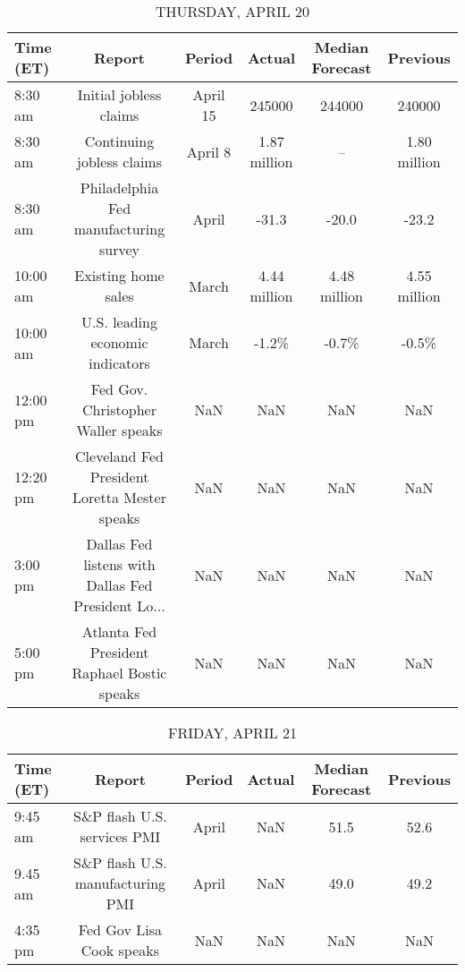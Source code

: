 \documentclass{article}%
\begin{document}
%


\begin{table}[htbp]%
\caption{THURSDAY, APRIL 20}%
\centering%
\begin{adjustbox}{width=1\textwidth}%
\begin{tabular}{lccccc}
\toprule
Time (ET) &                                             Report &   Period &       Actual & Median Forecast &     Previous \\
\midrule
  8:30 am &                             Initial jobless claims & April 15 &       245000 &          244000 &       240000 \\
  8:30 am &                          Continuing jobless claims &  April 8 & 1.87 million &              -- & 1.80 million \\
  8:30 am &              Philadelphia Fed manufacturing survey &    April &        -31.3 &           -20.0 &        -23.2 \\
 10:00 am &                                Existing home sales &    March & 4.44 million &    4.48 million & 4.55 million \\
 10:00 am &                   U.S. leading economic indicators &    March &        -1.2\% &           -0.7\% &        -0.5\% \\
 12:00 pm &                 Fed Gov. Christopher Waller speaks &      NaN &          NaN &             NaN &          NaN \\
 12:20 pm &      Cleveland Fed President Loretta Mester speaks &      NaN &          NaN &             NaN &          NaN \\
  3:00 pm & Dallas Fed listens with Dallas Fed President Lo... &      NaN &          NaN &             NaN &          NaN \\
  5:00 pm &        Atlanta Fed President Raphael Bostic speaks &      NaN &          NaN &             NaN &          NaN \\
\bottomrule
\end{tabular}
%
\end{adjustbox}%
\end{table}

%


\begin{table}[htbp]%
\caption{FRIDAY, APRIL 21}%
\centering%
\begin{adjustbox}{width=1\textwidth}%
\begin{tabular}{lccccc}
\toprule
Time (ET) &                           Report & Period & Actual & Median Forecast & Previous \\
\midrule
  9:45 am &      S\&P flash U.S. services PMI &  April &    NaN &            51.5 &     52.6 \\
  9.45 am & S\&P flash U.S. manufacturing PMI &  April &    NaN &            49.0 &     49.2 \\
  4:35 pm &         Fed Gov Lisa Cook speaks &    NaN &    NaN &             NaN &      NaN \\
\bottomrule
\end{tabular}
%
\end{adjustbox}%
\end{table}
\end{document}
